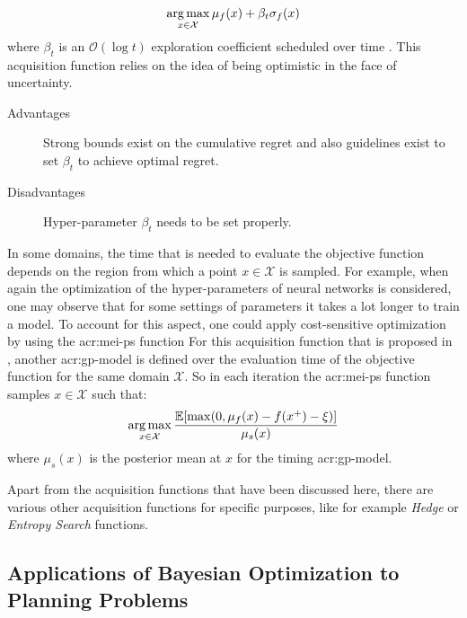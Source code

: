 \begin{description}
	$$\operatorname*{arg\,max}_{x \in \mathcal{X}} \mu_f(x) + \beta_t\sigma_f(x)$$
	where $\beta_t$ is an $\mathcal{O}(\log{t})$ exploration coefficient scheduled over time \cite{perchet2014gaussian}. This acquisition function relies on the idea of being optimistic in the face of uncertainty.
	\begin{description}
		\item[Advantages] Strong bounds exist on the cumulative regret and also guidelines exist to set $\beta_t$ to achieve optimal regret.
		\item[Disadvantages] Hyper-parameter $\beta_t$ needs to be set properly.
	\end{description}
\end{description}

In some domains, the time that is needed to evaluate the objective function depends on the region from which a point $x \in \mathcal{X}$ is sampled.
For example, when again the optimization of the hyper-parameters of neural networks is considered, one may observe that for some settings of parameters it takes a lot longer to train a model.
To account for this aspect, one could apply cost-sensitive optimization by using the \acrfull{acr:mei-ps} function
For this acquisition function that is proposed in \cite{snoek2012practical}, another \acrshort{acr:gp}-model is defined over the evaluation time of the objective function for the same domain $\mathcal{X}$.
So in each iteration the \acrshort{acr:mei-ps} function samples $x \in \mathcal{X}$ such that:
$$\operatorname*{arg\,max}_{x \in \mathcal{X}} \frac{\mathbb{E}[\max(0, \mu_f(x) - f(x^+) - \xi)]}{\mu_s(x)}$$
where $\mu_s(x)$ is the posterior mean at $x$ for the timing \acrshort{acr:gp}-model.

Apart from the acquisition functions that have been discussed here, there are various other acquisition functions for specific purposes, like for example \textit{Hedge} \cite{hoffman2011portfolio} or \textit{Entropy Search} \cite{wang2016optimization} functions.


\subsection{Applications of Bayesian Optimization to Planning Problems}
\label{sec:bayesian-optimization-applications}

